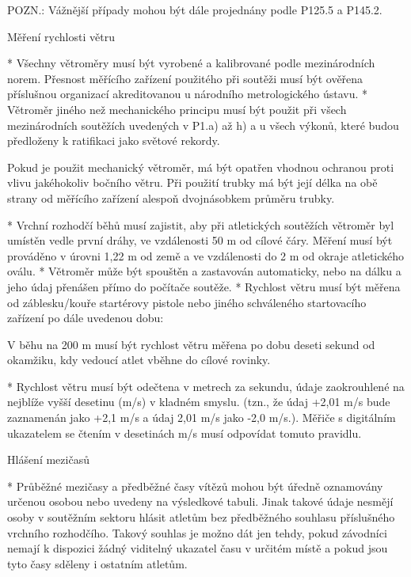 POZN.: Vážnější případy mohou být dále projednány podle P125.5 a P145.2.

Měření rychlosti větru

* Všechny větroměry musí být vyrobené a kalibrované podle mezinárodních norem. Přesnost měřícího zařízení použitého při soutěži musí být ověřena příslušnou organizací akreditovanou u národního metrologického ústavu.
* Větroměr jiného než mechanického principu musí být použit při všech mezinárodních soutěžích uvedených v P1.a) až h) a u všech výkonů, které budou předloženy k ratifikaci jako světové rekordy.

Pokud je použit mechanický větroměr, má být opatřen vhodnou ochranou proti vlivu jakéhokoliv bočního větru. Při použití trubky má být její délka na obě strany od měřícího zařízení alespoň dvojnásobkem průměru trubky.

* Vrchní rozhodčí běhů musí zajistit, aby při atletických soutěžích větroměr byl umístěn vedle první dráhy, ve vzdálenosti 50 m od cílové čáry. Měření musí být prováděno v úrovni 1,22 m od země a ve vzdálenosti do 2 m od okraje atletického oválu.
* Větroměr může být spouštěn a zastavován automaticky, nebo na dálku a jeho údaj přenášen přímo do počítače soutěže.
* Rychlost větru musí být měřena od záblesku/kouře startérovy pistole nebo jiného schváleného startovacího zařízení po dále uvedenou dobu:


V běhu na 200 m musí být rychlost větru měřena po dobu deseti sekund od okamžiku, kdy vedoucí atlet vběhne do cílové rovinky.

* Rychlost větru musí být odečtena v metrech za sekundu, údaje zaokrouhlené na nejblíže vyšší desetinu (m/s) v kladném smyslu. (tzn., že údaj +2,01 m/s bude zaznamenán jako +2,1 m/s a údaj  2,01 m/s jako -2,0 m/s.). Měřiče s digitálním ukazatelem se čtením v desetinách m/s musí odpovídat tomuto pravidlu.

Hlášení mezičasů

* Průběžné mezičasy a předběžné časy vítězů mohou být úředně oznamovány určenou osobou nebo uvedeny na výsledkové tabuli. Jinak takové údaje nesmějí osoby v soutěžním sektoru hlásit atletům bez předběžného souhlasu příslušného vrchního rozhodčího. Takový souhlas je možno dát jen tehdy, pokud závodníci nemají k dispozici žádný viditelný ukazatel času v určitém místě a pokud jsou tyto časy sděleny i ostatním atletům.

